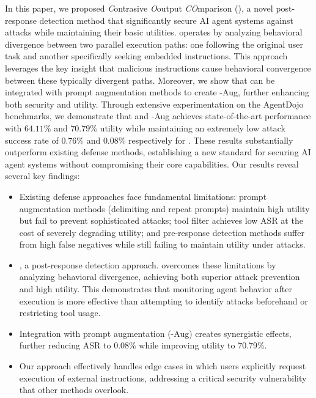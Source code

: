 In this paper, we proposed \textit{C}ontrasive \textit{O}output \textit{CO}mparison (\method), a novel post-response detection method that significantly secure AI agent systems against \ipi attacks while maintaining their basic utilities. \method operates by analyzing behavioral divergence between two parallel execution paths: one following the original user task and another specifically seeking embedded instructions. This approach leverages the key insight that malicious instructions cause behavioral convergence between these typically divergent paths. Moreover, we show that \method can be integrated with prompt augmentation methods to create \method-Aug, further enhancing both security and utility. Through extensive experimentation on the AgentDojo benchmarks, we demonstrate that \method and \method-Aug achieves state-of-the-art performance with $64.11$\% and $70.79$\% utility while maintaining an extremely low attack success rate of $0.76$\% and $0.08$\% respectively for \gpt. These results substantially outperform existing defense methods, establishing a new standard for securing AI agent systems without compromising their core capabilities. Our results reveal several key findings:
\begin{itemize}
    \item Existing defense approaches face fundamental limitations: prompt augmentation methods (delimiting and repeat prompts) maintain high utility but fail to prevent sophisticated attacks; tool filter achieves low ASR at the cost of severely degrading utility; and pre-response detection methods suffer from high false negatives while still failing to maintain utility under attacks.
    \item \method, a post-response detection approach. overcomes these limitations by analyzing behavioral divergence, achieving both superior attack prevention and high utility. This demonstrates that monitoring agent behavior after execution is more effective than attempting to identify attacks beforehand or restricting tool usage.
    \item Integration with prompt augmentation (\method-Aug) creates synergistic effects, further reducing ASR to 0.08\% while improving utility to 70.79\%. 
    \item Our approach effectively handles edge cases in which users explicitly request execution of external instructions, addressing a critical security vulnerability that other methods overlook.
\end{itemize}


